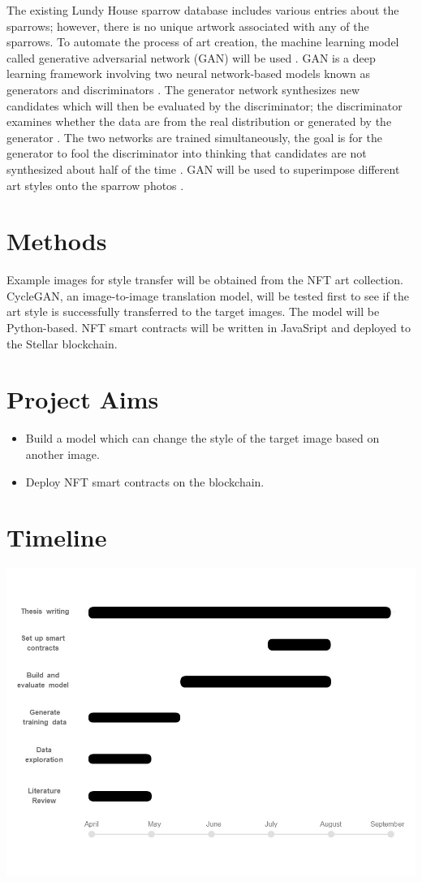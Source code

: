 \documentclass[11pt]{article}
\begin{document}
		\hspace{4ex} The existing Lundy House sparrow database includes various entries about the sparrows; however, there is no unique artwork associated with any of the sparrows. To automate the process of art creation, the machine learning model called generative adversarial network (GAN) will be used \citep{DBLP:journals/corr/abs-2112-10577}. GAN is a deep learning framework involving two neural network-based models known as generators and discriminators \citep{AGGARWAL2021100004}. The generator network synthesizes new candidates which will then be evaluated by the discriminator; the discriminator examines whether the data are from the real distribution or generated by the generator \citep{AGGARWAL2021100004}. The two networks are trained simultaneously, the goal is for the generator to fool the discriminator into thinking that candidates are not synthesized about half of the time \citep{DBLP:journals/corr/abs-2112-10577} \citep{AGGARWAL2021100004}. GAN will be used to superimpose different art styles onto the sparrow photos \citep{DBLP:journals/corr/abs-1711-06454}. 
	
	\section*{Methods}
		Example images for style transfer will be obtained from the NFT art collection. CycleGAN, an image-to-image translation model, will be tested first to see if the art style is successfully transferred to the target images. The model will be Python-based. NFT smart contracts will be written in JavaSript and deployed to the Stellar blockchain.
		
	\section*{Project Aims}
		\begin{itemize}
			\item Build a model which can change the style of the target image based on another image.
			\item Deploy NFT smart contracts on the blockchain.
		\end{itemize}
		
	\section*{Timeline}
		\includegraphics[width = \textwidth]{gantt.jpg}
		
	
	
\end{document}
